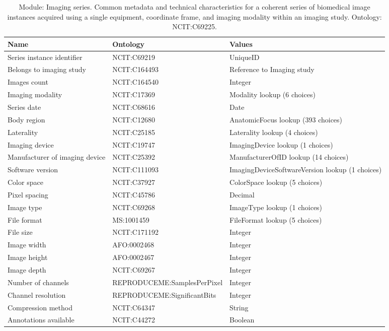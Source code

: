 \documentclass{article}
\begin{document}
\begin{table}[htb]
\begin{tabular}{lll}
Name & Ontology & Values \\
\hline
Series instance identifier & NCIT:C69219 & UniqueID \\
Belongs to imaging study & NCIT:C164493 & Reference to Imaging study \\
Images count & NCIT:C164540 & Integer \\
Imaging modality & NCIT:C17369 & Modality lookup (6 choices) \\
Series date & NCIT:C68616 & Date \\
Body region & NCIT:C12680 & AnatomicFocus lookup (393 choices) \\
Laterality & NCIT:C25185 & Laterality lookup (4 choices) \\
Imaging device & NCIT:C19747 & ImagingDevice lookup (1 choices) \\
Manufacturer of imaging device & NCIT:C25392 & ManufacturerOfID lookup (14 choices) \\
Software version & NCIT:C111093 & ImagingDeviceSoftwareVersion lookup (1 choices) \\
Color space & NCIT:C37927 & ColorSpace lookup (5 choices) \\
Pixel spacing & NCIT:C45786 & Decimal \\
Image type & NCIT:C69268 & ImageType lookup (1 choices) \\
File format & MS:1001459 & FileFormat lookup (5 choices) \\
File size & NCIT:C171192 & Integer \\
Image width & AFO:0002468 & Integer \\
Image height & AFO:0002467 & Integer \\
Image depth & NCIT:C69267 & Integer \\
Number of channels & REPRODUCEME:SamplesPerPixel & Integer \\
Channel resolution & REPRODUCEME:SignificantBits & Integer \\
Compression method & NCIT:C64347 & String \\
Annotations available & NCIT:C44272 & Boolean \\
\hline
\end{tabular}
\caption[Module: Imaging series]{\label{table:table14} Module: Imaging series. Common metadata and technical characteristics for a coherent series of biomedical image instances acquired using a single equipment, coordinate frame, and imaging modality within an imaging study. Ontology: NCIT:C69225. }
\end{table}
\end{document}
